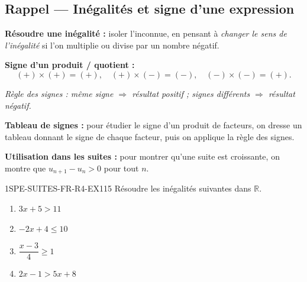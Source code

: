 

\subsection*{Rappel — Inégalités et signe d'une expression}

\textbf{Résoudre une inégalité :} isoler l'inconnue, en pensant à \emph{changer le sens de l'inégalité} si l'on multiplie ou divise par un nombre négatif.

\textbf{Signe d'un produit / quotient :}
\[
  (+) \times (+) = (+), \quad (+) \times (-) = (-), \quad (-) \times (-) = (+).
\]
\begin{center}
\textit{Règle des signes : même signe $\Rightarrow$ résultat positif ; signes différents $\Rightarrow$ résultat négatif.}
\end{center}

\textbf{Tableau de signes :} pour étudier le signe d'un produit de facteurs, on dresse un tableau donnant le signe de chaque facteur, puis on applique la règle des signes.

\textbf{Utilisation dans les suites :} pour montrer qu'une suite est croissante, on montre que $u_{n+1} - u_n > 0$ pour tout $n$.


\begin{exercice}{1SPE-SUITES-FR-R4-EX1}{1}{5}
Résoudre les inégalités suivantes dans $\mathbb{R}$.
\begin{enumerate}
  \item $3x + 5 > 11$
  \item $-2x + 4 \leq 10$
  \item $\dfrac{x - 3}{4} \geq 1$
  \item $2x - 1 > 5x + 8$
\end{enumerate}
\end{exercice}

